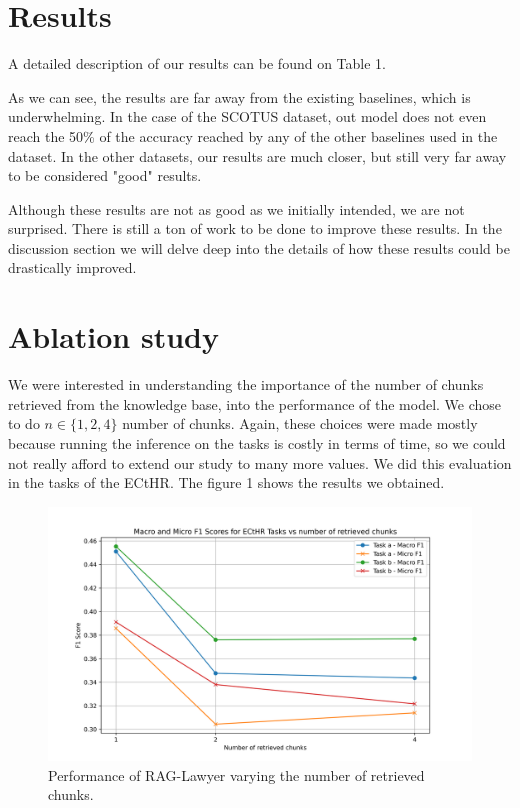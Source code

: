 \documentclass[11pt]{article}
\begin{document}
\section{Results}

A detailed description of our results can be found on Table 1.


As we can see, the results are far away from the existing baselines, which is underwhelming. In the case of the SCOTUS dataset, out model does not even reach the 50\% of the accuracy reached by any of the other baselines used in the dataset. In the other datasets, our results are much closer, but still very far away to be considered "good" results.

Although these results are not as good as we initially intended, we are not surprised. There is still a ton of work to be done to improve these results. In the discussion section we will delve deep into the details of how these results could be drastically improved.

\section{Ablation study}
We were interested in understanding the importance of the number of chunks retrieved from the knowledge base, into the performance of the model. We chose to do $n \in \{1, 2, 4\}$ number of chunks. Again, these choices were made mostly because running the inference on the tasks is costly in terms of time, so we could not really afford to extend our study to many more values. We did this evaluation in the tasks of the ECtHR. The figure 1 shows the results we obtained.

\begin{figure}
  \includegraphics[scale=0.32]{ablation.png}
  \caption{Performance of RAG-Lawyer varying the number of retrieved chunks.}
\end{figure}
\end{document}
